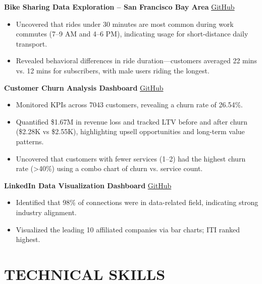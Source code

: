 \documentclass[11pt]{article}
\begin{document}
\textbf{Bike Sharing Data Exploration – San Francisco Bay Area} \hfill \href{https://github.com/Mostafa-Elnagar/bikesharing_project}{GitHub}
\begin{itemize}
\item Uncovered that rides under 30 minutes are most common during work commutes (7–9 AM and 4–6 PM), indicating usage for short-distance daily transport.
\item Revealed behavioral differences in ride duration—customers averaged 22 mins vs. 12 mins for subscribers, with male users riding the longest.\\
\end{itemize}

\textbf{Customer Churn Analysis Dashboard} \hfill \href{https://github.com/Mostafa-Elnagar/ChurnAnalysisDashboard}{GitHub}
\begin{itemize}
\item Monitored KPIs across 7043 customers, revealing a churn rate of 26.54\%.
\item Quantified \$1.67M in revenue loss and tracked LTV before and after churn (\$2.28K vs \$2.55K), highlighting upsell opportunities and long-term value patterns.
\item Uncovered that customers with fewer services (1–2) had the highest churn rate (>40\%) using a combo chart of churn vs. service count.\\
\end{itemize}

\textbf{LinkedIn Data Visualization Dashboard} \hfill \href{https://github.com/Mostafa-Elnagar/linkedin-dashboard}{GitHub}
\begin{itemize}
  \item Identified that 98\% of connections were in data-related field, indicating strong industry alignment.
  \item Visualized the leading 10 affiliated companies via bar charts; ITI ranked highest.
\end{itemize}

\section{TECHNICAL SKILLS}
\end{document}
